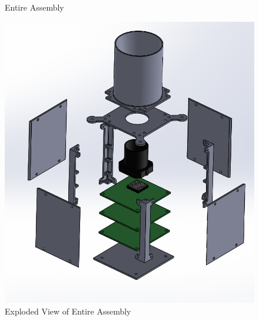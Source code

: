 \documentclass[../../main.tex]{subfiles}
\begin{document}
\begin{enumerate}
\begin{figure}[H]
            \caption{Entire Assembly}
            \label{fig:sys_CAD}
        \end{figure}
        \begin{figure}[H]
            \centering
            \includegraphics[scale=0.6]{Figures/Mechanical/STADS_Support_Integration.PNG}
            \caption{Exploded View of Entire Assembly}
            \label{fig:sys_CAD}
        \end{figure}
    \end{enumerate}

\end{document}
